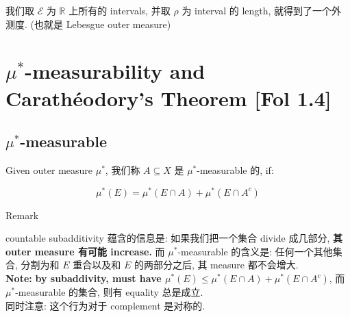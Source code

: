\begin{example}

我们取 \(\mathcal{E}\) 为 \(\mathbb{R}\) 上所有的 intervals, 并取 \(\rho\) 为 interval 的 length, 就得到了一个外测度. (也就是 Lebesgue outer measure)

\end{example}

\section{\texorpdfstring{\(\mu^{\ast}\)-measurability and Carathéodory's Theorem {[}Fol 1.4{]}}{\textbackslash mu\^{}\{\textbackslash ast\}-measurability and Carathéodory's Theorem {[}Fol 1.4{]}}}

\subsection{\texorpdfstring{\(\mu^{\ast}\)-measurable}{\textbackslash mu\^{}\{\textbackslash ast\}-measurable}}

\begin{definition}{}

Given outer measure \(\mu^{\ast}\), 我们称 \(A \subseteq X\) 是 \(\mu^{\ast}\)-measurable 的, if:

\[\mu^{\ast}(E) = \mu^{\ast}(E \cap A) + \mu^{\ast}(E \cap A^{c})\]

\end{definition}

\begin{qlremark}{Remark}

countable subadditivity 蕴含的信息是: 如果我们把一个集合 divide 成几部分, \textbf{其 outer measure 有可能 increase.} 而 \(\mu^{\ast}\)-measurable 的含义是: 任何一个其他集合, 分割为和 \(E\) 重合以及和 \(E\) 的两部分之后, 其 measure 都不会增大.\\
\textbf{Note:} \textbf{by subaddivity, must have \(\mu^{\ast}(E) \leq \mu^{\ast}(E \cap A) + \mu^{\ast}(E \cap A^{c})\)}, 而 \(\mu^{\ast}\)-measurable 的集合, 则有 equality 总是成立.\\
同时注意: 这个行为对于 complement 是对称的.

\end{qlremark}

